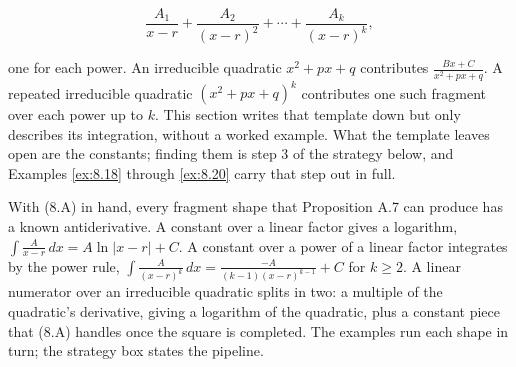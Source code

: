 \documentclass[a4paper,12pt,oneside]{memoir}
\begin{document}
\[ \frac{A_{1}}{x - r} + \frac{A_{2}}{(x - r)^{2}} + \cdots + \frac{A_{k}}{(x - r)^{k}}, \]

one for each power. An irreducible quadratic \(x^{2} + px + q\) contributes \(\frac{Bx + C}{x^{2} + px + q}\). A repeated irreducible quadratic \((x^{2} + px + q)^{k}\) contributes one such fragment over each power up to \(k\). This section writes that template down but only describes its integration, without a worked example. What the template leaves open are the constants; finding them is step 3 of the strategy below, and Examples \ref{ex:8.18} through \ref{ex:8.20} carry that step out in full.

With (8.A) in hand, every fragment shape that Proposition A.7 can produce has a known antiderivative. A constant over a linear factor gives a logarithm, \(\int\frac{A}{x - r}\,dx = A\ln\lvert x - r\rvert + C\). A constant over a power of a linear factor integrates by the power rule, \(\int\frac{A}{(x - r)^{k}}\,dx = \frac{-A}{(k - 1)(x - r)^{k - 1}} + C\) for \(k \ge 2\). A linear numerator over an irreducible quadratic splits in two: a multiple of the quadratic’s derivative, giving a logarithm of the quadratic, plus a constant piece that (8.A) handles once the square is completed. The examples run each shape in turn; the strategy box states the pipeline.
\end{document}
